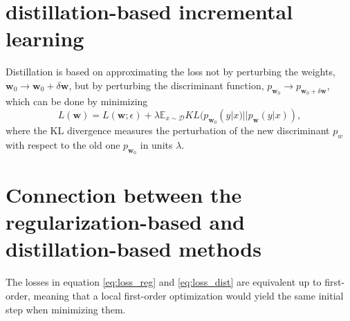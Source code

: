 \documentclass{article}
\begin{document}
\section{distillation-based incremental learning \cite{Liu2020}}
Distillation is based on approximating the loss not by perturbing the weights, $\mathbf w_0 \rightarrow \mathbf w_0 + \delta \mathbf w$,
but by perturbing the discriminant function, $p_{\mathbf w_0} \rightarrow p_{\mathbf w_0 + \delta \mathbf w}$,
which can be done by minimizing 
\begin{equation}
    \label{eq:loss_dist}
    L(\mathbf w) = L(\mathbf w; \mathcal \epsilon)
    + \lambda \mathbb{E}_{x \sim \mathcal D}
    KL(p_{\mathbf w_0}(y|x) || p_{\mathbf w}(y|x)),
\end{equation}
where the KL divergence measures the perturbation of the new discriminant $p_w$
with respect to the old one $p_{\mathbf w_0}$ in units $\lambda$.

\section{Connection between the regularization-based and distillation-based methods \cite{Liu2020}}
The losses in equation \ref{eq:loss_reg} and \ref{eq:loss_dist} are equivalent up to first-order,
meaning that a local first-order optimization would yield the same initial step when minimizing them.



\end{document}
